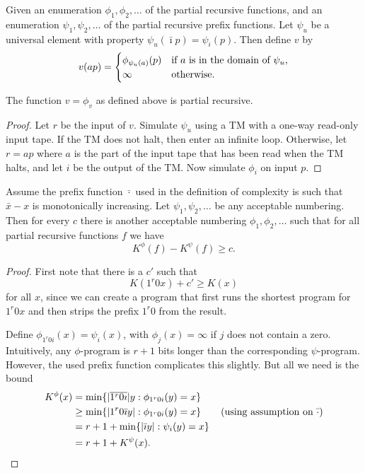 \documentclass{style/llncs}
\newcommand{\tn}[1]{\textnormal{#1}}
\begin{document}
{\begin{definition}
Given an enumeration $\phi_1,\phi_2,\ldots$ of the partial recursive functions, and an enumeration $\psi_1,\psi_2,\ldots$ of the partial recursive prefix functions. Let $\psi_u$ be a universal element with property $\psi_u(\bar\imath p)=\psi_i(p)$. Then define $v$ by
\[
v(a p)=\begin{cases}\phi_{\psi_u(a)}(p)&\tn{if $a$ is in the domain of $\psi_u$,}\\
\infty&\tn{otherwise}.\end{cases}
\]
\end{definition}
\begin{lemma}
The function $v=\phi_v$ as defined above is partial recursive.
\end{lemma}
\begin{proof}
Let $r$ be the input of $v$. Simulate $\psi_u$ using a TM with a one-way read-only input tape. If the TM does not halt, then enter an infinite loop. Otherwise, let $r=ap$ where $a$ is the part of the input tape that has been read when the TM halts, and let $i$ be the output of the TM. Now simulate $\phi_i$ on input $p$.
\end{proof}

\begin{lemma}
Assume the prefix function $\bar\cdot$ used in the definition of complexity is such that $\bar x-x$ is monotonically increasing. Let $\psi_1,\psi_2,\ldots$ be any acceptable numbering. Then for every $c$ there is another acceptable numbering $\phi_1,\phi_2,\ldots$ such that for all partial recursive functions $f$ we have
\[
K^\phi(f)-K^\psi(f) \ge c.
\] \label{lemma:building-block}
\end{lemma}
\begin{proof}
First note that there is a $c'$ such that 
\begin{equation}
	K(1^r 0  x) + c' \geq K(x) \label{eq:prelim1}
\end{equation}
for all $x$, since we can create a program that first runs the shortest program for $1^r 0 x$ and then strips the prefix $1^r 0$ from the result.

Define $\phi_{1^r0i}(x) = \psi_{i}(x)$, with $\phi_{j}(x) = \infty$ if $j$ does not contain a zero. Intuitively, any $\phi$-program is $r+1$ bits longer than the corresponding $\psi$-program. However, the used prefix function complicates this slightly. But all we need is the bound
\begin{equation}\label{eq:prelim2}\begin{split}
K^\phi(x) &= \min \{ |\overline{1^r 0 \imath}| y : \phi_{1^r 0 i}(y) = x \}\\
&  \ge \min\{|1^r0\bar\imath y| : \phi_{1^r 0 i}(y) = x \}\qquad\tn{(using assumption on $\bar\cdot$)}\\
& = r+1 +\min\{|\bar\imath y| : \psi_i(y) = x \}\\
& = r+1+K^\psi(x).
\end{split}\end{equation}


\end{proof}}
\end{document}
